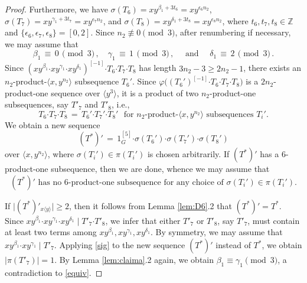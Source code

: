 \documentclass[leqno,a4paper]{amsart}
\def\bd{{\boldsymbol{\cdot}}}
\def\Z{\mathbb Z}
\theoremstyle{plain}
\theoremstyle{definition}
\numberwithin{equation}{section}
\begin{document}
\begin{proof}
    Furthermore, we have $\sigma(T_6)=xy^{\beta_1+3t_6}=xy^{\epsilon_6n_2}$, $\sigma(T_7)=xy^{\gamma_1+3t_7}=xy^{\epsilon_7n_2}$, and $\sigma(T_8)=xy^{\delta_1+3t_8}=xy^{\epsilon_8n_2}$, where $t_6,t_7, t_8\in \Z$ and $\{\epsilon_6, \epsilon_7,\epsilon_8\}= [0,2]$. Since $n_2\not\equiv 0 \pmod {3}$, after renumbering if necessary, we may assume that
    \begin{equation}\label{equiv}
      \beta_1 \, \equiv \, 0 \, \pmod 3 \,, \quad \gamma_1 \, \equiv \, 1 \, \pmod 3 \,, \quad \mbox{ and } \quad \delta_1 \, \equiv \, 2 \, \pmod 3 \,.
    \end{equation}
		Since $(xy^{\beta_1} \bd xy^{\gamma_1} \bd xy^{\delta_1})^{[-1]} \bd T_6 \bd T_7 \bd T_8$ has length $3n_2-3\ge 2n_2-1$, there exists an $n_2$-product-$\langle x,y^{n_2} \rangle$ subsequence $T_6'$.
        Since $\varphi \big( (T_6')^{[-1]} \bd T_6 \bd T_7 \bd T_8 \big)$ is a $2n_2$-product-one sequence over $\langle y^3\rangle$,  it is a product of two $n_2$-product-one subsequences, say $T'_7$ and $T'_8$, i.e.,
        \[
          T_6 \bd T_7 \bd T_8 \, = \, T_6' \bd T_7' \bd T_8' \,\, \mbox{ for $n_2$-product-$\langle x, y^{n_2} \rangle$ subsequences $T_i'$.}
        \]
        We obtain a new sequence
        \[
          (T^*)' \, = \, 1^{[5]}_G \bd \sigma(T_6') \bd \sigma(T_7') \bd \sigma(T_8')
        \]
        over $\langle x, y^{n_2} \rangle$, where $\sigma(T_i')\in \pi(T_i')$ is chosen arbitrarily.
        If $(T^*)'$ has a 6-product-one subsequence, then we are done, whence we may assume that
        \begin{equation}\label{6-free*}
        \text{$(T^*)'$ has no 6-product-one subsequence for any choice of $\sigma(T_i')\in \pi(T_i')$.}
        \end{equation}


        If $\big|(T^*)'_{x \langle y \rangle} \big| \ge 2$, then it follows from Lemma \ref{lem:D6}.2 that $(T^*)' = T^*$.
        Since $xy^{\beta_1} \bd xy^{\gamma_1} \bd xy^{\delta_1} \mid T'_7 \bd T'_8$, we infer that either $T'_7$ or $T'_8$, say $T'_7$, must contain at least two terms among $xy^{\beta_1}, xy^{\gamma_1}, xy^{\delta_1}$.
        By symmetry, we may assume that $xy^{\beta_1} \bd xy^{\gamma_1} \mid T'_7$.
        Applying \eqref{sig} to the new sequence $(T^*)'$ instead of $T^*$, we obtain $| \pi (T'_7)| = 1$. By Lemma \ref{lem:claima}.2 again, we obtain $\beta_1 \equiv \gamma_1 \pmod{3}$, a contradiction to \eqref{equiv}.



\end{proof}
\end{document}
